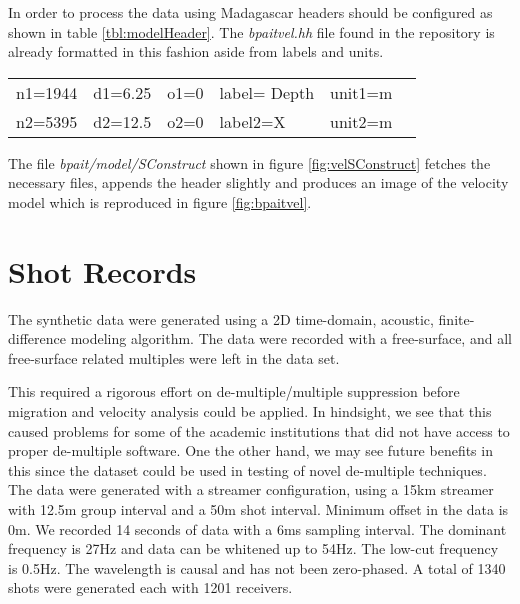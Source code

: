 In order to process the data using Madagascar headers should be configured as shown in table \ref{tbl:modelHeader}.  
The \emph{bpaitvel.hh} file found in the repository is already formatted in this fashion aside from labels and units.    

{
\begin{tabular}{|llllll|}
        \hline
    n1=1944    &     d1=6.25   &        o1=0  &        label= Depth & unit1=m &  \\
    n2=5395   &     d2=12.5   &        o2=0  &        label2=X     & unit2=m &  \\
        \hline
\end{tabular}
}

The file \emph{bpait/model/SConstruct} shown in figure \ref{fig:velSConstruct} fetches the necessary files, 
appends the header slightly and produces an image of the velocity model which is reproduced in figure \ref{fig:bpaitvel}.

{
\tiny

\normalsize
}



\section{Shot Records}
The synthetic data were generated using a 2D time-domain, acoustic, finite-difference
modeling algorithm. The data were recorded with a free-surface, and all free-surface related multiples were left in the data set.

This required a rigorous effort on de-multiple/multiple suppression
before migration and velocity analysis could be applied. In hindsight, we see that this caused
problems for some of the academic institutions that did not have access to proper de-multiple
software. One the other hand, we may see future benefits in this since the dataset could be
used in testing of novel de-multiple techniques.
The data were generated with a streamer configuration, using a 15km streamer with 12.5m
group interval and a 50m shot interval. Minimum offset in the data is 0m. We recorded 14
seconds of data with a 6ms sampling interval. The dominant frequency is 27Hz and data can
be whitened up to 54Hz. The low-cut frequency is 0.5Hz. The wavelength is causal and has
not been zero-phased. A total of 1340 shots were generated each with 1201 receivers.

